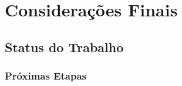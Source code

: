 \chapter[Considerações Finais]{Considerações Finais}

\section{Status do Trabalho}
\subsection{Próximas Etapas}
